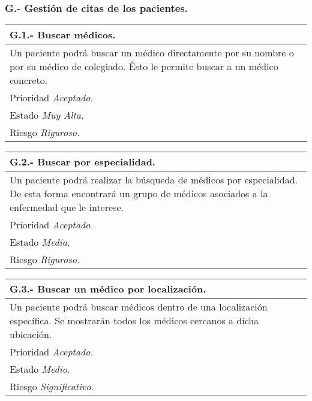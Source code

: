 \documentclass[a4paper,oneside,11pt]{book}
\begin{document}
\subsubsection{G.- Gestión de citas de los pacientes.}

\begin{center}
\begin{tabulary}{15cm}{|L|}
	\hline
		\bf{G.1.- Buscar médicos.} \\
	\hline
		Un paciente podrá buscar un médico directamente por su nombre o por su médico de colegiado. Ésto le permite buscar a un médico concreto. \\
	\hline
		Prioridad \textit{Aceptado.} \\
	\hline
		Estado \textit{Muy Alta.} \\
	\hline
		Riesgo \textit{Riguroso.} \\
	\hline
\end{tabulary}
\end{center}

\begin{center}
\begin{tabulary}{15cm}{|L|}
	\hline
		\bf{G.2.- Buscar por especialidad.} \\
	\hline
		Un paciente podrá realizar la búsqueda de médicos por especialidad. De esta forma encontrará un grupo de médicos asociados a la enfermedad que le interese. \\
	\hline
		Prioridad \textit{Aceptado.} \\
	\hline
		Estado \textit{Media.} \\
	\hline
		Riesgo \textit{Riguroso.} \\
	\hline
\end{tabulary}
\end{center}

\begin{center}
\begin{tabulary}{15cm}{|L|}
	\hline
		\bf{G.3.- Buscar un médico por localización.} \\
	\hline
		Un paciente podrá buscar médicos dentro de una localización específica. Se mostrarán todos los médicos cercanos a dicha ubicación. \\
	\hline
		Prioridad \textit{Aceptado.} \\
	\hline
		Estado \textit{Medio.} \\
	\hline
		Riesgo \textit{Significativo.} \\
	\hline
\end{tabulary}
\end{center}
\end{document}
